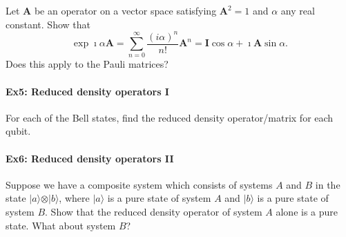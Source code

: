 Let $\bm{A}$ be an operator on a vector space satisfying $\bm{A}^2=1$ and $\alpha$ any real constant. Show that
\[
\exp{\imath\alpha \bm{A}}=\sum_{n=0}^{\infty} \frac{(i\alpha)^n}{n!}\bm{A}^n=\bm{I}\cos{\alpha}+\imath\bm{A}\sin{\alpha}.
\]
Does this apply to the Pauli matrices?


\paragraph{Ex5: Reduced density operators I}

For each of the Bell states, find the reduced density operator/matrix for each qubit.


\paragraph{Ex6: Reduced density operators II}

Suppose we have a composite system which consists of systems $A$ and
$B$ in the state $\vert a\rangle \otimes \vert b\rangle$, where $\vert
a\rangle $ is a pure state of system $A$ and $\vert b\rangle$ is a
pure state of system $B$. Show that the reduced density operator of
system $A$ alone is a pure state. What about system $B$?
